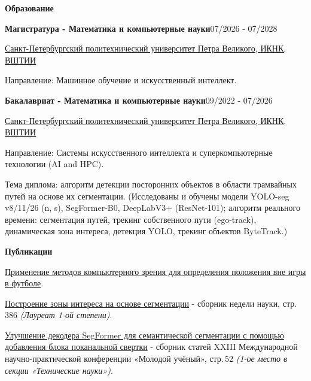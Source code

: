 \documentclass[10pt,a4paper]{article}
\newlength{\mainwidth}\setlength{\mainwidth}{0.66\paperwidth}
\newlength{\mainpad}\setlength{\mainpad}{0.75cm}
\newcommand{\mainheading}[1]{%
  \vspace{8pt}%
  {\color{sidebar}\bfseries\Large #1}\par
  \vspace{-5pt}{\color{accent}\rule{\linewidth}{1.6pt}}\par\vspace{5pt}}
\newcommand{\entry}[3]{%
  {\bfseries #1}\hfill{\color{accent}\small #3}\par
  {\color{accent}\small #2}\par\vspace{2pt}}
\begin{document}
\begin{minipage}[t]{\mainwidth}
\begin{minipage}[t]{\dimexpr\linewidth-1.5\mainpad\relax}
    \mainheading{Образование}
    \entry{Магистратура - Математика и компьютерные науки}{\href{https://ai.spbstu.ru}{Санкт-Петербургский политехнический университет Петра Великого, ИКНК, ВШТИИ}}{07/2026 - 07/2028}
    \begin{cvbullets}
      \item Направление: Машинное обучение и искусственный интеллект.
    \end{cvbullets}
    \vspace{3pt}
    \entry{Бакалавриат - Математика и компьютерные науки}{\href{https://ai.spbstu.ru}{Санкт-Петербургский политехнический университет Петра Великого, ИКНК, ВШТИИ}}{09/2022 - 07/2026}
    \begin{cvbullets}
      \item Направление: Системы искусственного интеллекта и суперкомпьютерные технологии (AI and HPC).
      \item Тема диплома: алгоритм детекции посторонних объектов в области трамвайных путей на основе их сегментации. (Исследованы и обучены модели YOLO-seg v8/11/26 (n, s), SegFormer-B0, DeepLabV3+ (ResNet-101); алгоритм реального времени: сегментация путей, трекинг собственного пути (ego-track), динамическая зона интереса, детекция YOLO, трекинг объектов ByteTrack.)
    \end{cvbullets}

    \mainheading{Публикации}
    \begin{cvbullets}
      \item \href{https://www.elibrary.ru/item.asp?id=80243926}{Применение методов компьютерного зрения для определения положения вне игры в футболе}.
      \item \href{https://elib.spbstu.ru/dl/2/i26-137.pdf/download/i26-137.pdf}{Построение зоны интереса на основе сегментации} - сборник недели науки, стр.\,386 \textit{(Лауреат 1-ой степени)}.
      \item \href{https://naukaip.ru/wp-content/uploads/2026/10/MK-2794.pdf}{Улучшение декодера SegFormer для семантической сегментации с помощью добавления блока поканальной свертки} - сборник статей XXIII Международной научно-практической конференции «Молодой учёный», стр.\,52 \textit{(1-ое место в секции «Технические науки»)}.
    \end{cvbullets}
  \end{minipage}
\end{minipage}
\end{document}
